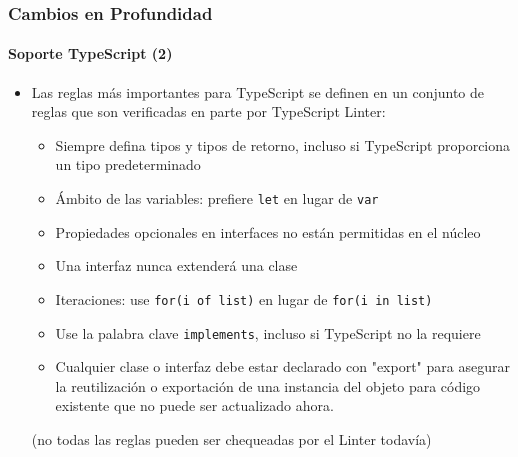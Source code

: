 \begin{frame}[fragile]
	\frametitle{Cambios en Profundidad}
	\framesubtitle{Soporte TypeScript (2)}

	\begin{itemize}
		\item Las reglas más importantes para TypeScript se definen en un conjunto de reglas que son verificadas en parte por TypeScript Linter:

			\begin{itemize}
				\item Siempre defina tipos y tipos de retorno, incluso si TypeScript proporciona un tipo predeterminado
				\item Ámbito de las variables: prefiere \texttt{let} en lugar de \texttt{var}
				\item Propiedades opcionales en interfaces no están permitidas en el núcleo
				\item Una interfaz nunca extenderá una clase
				\item Iteraciones: use \texttt{for(i of list)} en lugar de \texttt{for(i in list)}
				\item Use la palabra clave \texttt{implements}, incluso si TypeScript no la requiere
				\item Cualquier clase o interfaz debe estar declarado con "export" para asegurar la reutilización o exportación de una instancia del objeto para código existente que no puede ser actualizado ahora.
			\end{itemize}

			\small(no todas las reglas pueden ser chequeadas por el Linter todavía)\normalsize
	\end{itemize}

\end{frame}


